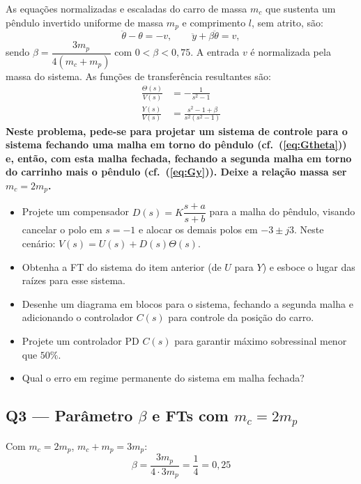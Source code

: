 \documentclass[12pt,a4paper]{article}
\begin{document}
\begin{enunciado}
As equações normalizadas e escaladas do carro de massa $m_c$ que sustenta um
pêndulo invertido uniforme de massa $m_p$ e comprimento $l$, sem atrito, são:
\[
  \ddot{\theta} - \theta = -v, \qquad
  \ddot{y} + \beta\ddot{\theta} = v,
\]
sendo $\beta = \dfrac{3m_p}{4(m_c+m_p)}$ com $0 < \beta < 0{,}75$.
A entrada $v$ é normalizada pela massa do sistema.
As funções de transferência resultantes são:
\begin{align}
  \frac{\Theta(s)}{V(s)} &= -\frac{1}{s^2-1} \label{eq:Gtheta}\\[4pt]
  \frac{Y(s)}{V(s)} &= \frac{s^2-1+\beta}{s^2(s^2-1)} \label{eq:Gy}
\end{align}
\textbf{Neste problema, pede-se para projetar um sistema de controle para o
sistema fechando uma malha em torno do pêndulo (cf.\ (\ref{eq:Gtheta})) e,
então, com esta malha fechada, fechando a segunda malha em torno do carrinho
mais o pêndulo (cf.\ (\ref{eq:Gy})). Deixe a relação massa ser $m_c = 2m_p$.}

\begin{itemize}
  \item[(a)] Projete um compensador $D(s) = K\dfrac{s+a}{s+b}$ para a malha do
  pêndulo, visando cancelar o polo em $s=-1$ e alocar os demais polos em
  $-3 \pm j3$. Neste cenário: $V(s) = U(s) + D(s)\Theta(s)$.
  \item[(b)] Obtenha a FT do sistema do item anterior (de $U$ para $Y$) e
  esboce o lugar das raízes para esse sistema.
  \item[(c)] Desenhe um diagrama em blocos para o sistema, fechando a segunda
  malha e adicionando o controlador $C(s)$ para controle da posição do carro.
  \item[(d)] Projete um controlador PD $C(s)$ para garantir máximo sobressinal
  menor que $50\%$.
  \item[(e)] Qual o erro em regime permanente do sistema em malha fechada?
\end{itemize}
\end{enunciado}

\subsection*{Q3 — Parâmetro $\beta$ e FTs com $m_c = 2m_p$}

Com $m_c = 2m_p$, $m_c + m_p = 3m_p$:
\[
  \beta = \frac{3m_p}{4 \cdot 3m_p} = \frac{1}{4} = 0{,}25
\]
\end{document}
